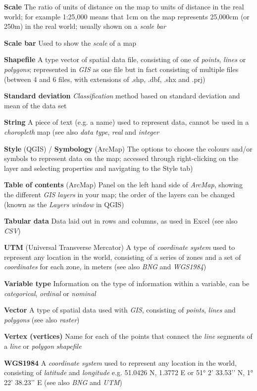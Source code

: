 \documentclass[a4paper,10pt]{article}
\begin{document}
\begin{multicols}{2}
\textbf{Scale} The ratio of units of distance on the map to units of distance in the real world; for example 1:25,000 means that 1cm on the map represents 25,000cm (or 250m) in the real world; usually shown on a \textit{scale bar}

\textbf{Scale bar} Used to show the \textit{scale} of a map

\textbf{Shapefile} A type vector of spatial data file, consisting of one of \textit{points}, \textit{lines} or \textit{polygons}; represented in \textit{GIS} as one file but in fact consisting of multiple files (between 4 and 6 files, with extensions of .shp, .dbf, .shx and  .prj)

\textbf{Standard deviation} \textit{Classification} method based on standard deviation and mean of the data set  

\textbf{String} A piece of text (e.g. a name) used to represent data, cannot be used in a \textit{choropleth} map (see also \textit{data type}, \textit{real} and \textit{integer} 

\textbf{Style} (QGIS) / \textbf{Symbology} (ArcMap) The options to choose the colours and/or symbols to represent data on the map; accessed through right-clicking on the layer and selecting properties and navigating to the Style tab)

\textbf{Table of contents} (ArcMap) Panel on the left hand side of \textit{ArcMap}, showing the different \textit{GIS} \textit{layers} in your map; the order of the layers can be changed (known as the \textit{Layers window} in QGIS)

\textbf{Tabular data} Data laid out in rows and columns, as used in Excel (see also \textit{CSV})

\textbf{UTM} (Universal Transverse Mercator) A type of \textit{coordinate system} used to represent any location in the world, consisting of a series of zones and a set of \textit{coordinates} for each zone, in meters (see also \textit{BNG} and \textit{WGS1984}) 

\textbf{Variable type} Information on the type of information within a variable, can be \textit{categorical}, \textit{ordinal} or \textit{nominal} 

\textbf{Vector} A type of spatial data used with \textit{GIS}, consisting of \textit{points}, \textit{lines} and \textit{polygons} (see also \textit{raster})

\textbf{Vertex (vertices)} Name for each of the points that connect the \textit{line} segments of a \textit{line} or \textit{polygon} \textit{shapefile}

\textbf{WGS1984} A \textit{coordinate system} used to represent any location in the world, consisting of \textit{latitude} and \textit{longitude} e.g. 51.0426 N, 1.3772 E or \ang{51} 2’ 33.53’’ N, \ang{1} 22’ 38.23’’ E (see also \textit{BNG} and \textit{UTM}) 

\end{multicols}
\end{document}
